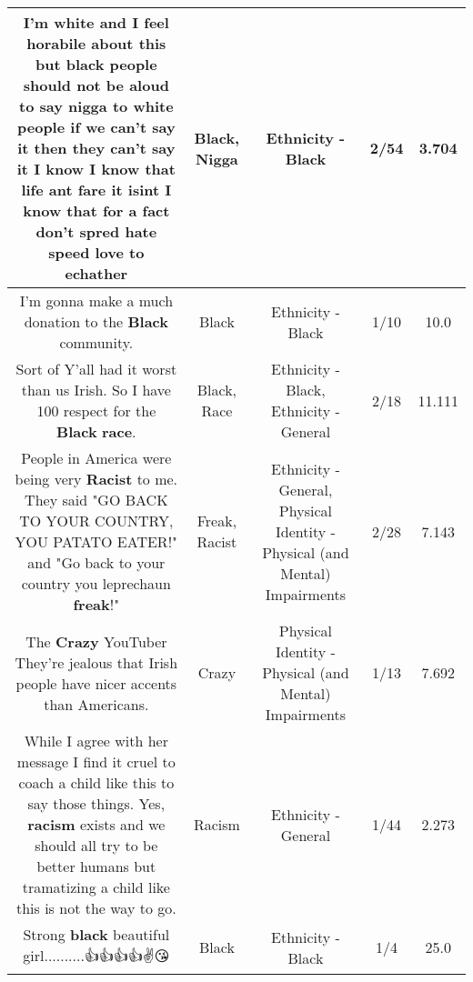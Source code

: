 \documentclass[11pt]{article}
\newlength\mylength
\begin{document}
\begin{center}
\begin{longtable}{|C{.65\mylength}|C{.30\mylength}|C{.12\mylength}|C{.12\mylength}|C{.12\mylength}|}
  \small I'm white and I feel horabile about this but \textbf{black} people should not be aloud to say \textbf{nigga} to white people if we can't say it then they can't say it I know I know  that life ant fare it isint I know that for a fact don't spred hate speed love to echather\normalsize   & Black, Nigga & Ethnicity - Black & 2/54 & 3.704 \\  \hline
  \small I'm gonna make a much donation to the \textbf{Black} community.\normalsize   & Black & Ethnicity - Black & 1/10 & 10.0 \\  \hline
  \small Sort of Y'all had it worst than us Irish. So I have 100 respect for the \textbf{Black} \textbf{race}.\normalsize   & Black, Race & Ethnicity - Black, Ethnicity - General & 2/18 & 11.111 \\  \hline
  \small People in America were being very \textbf{Racist} to me. They said "GO BACK TO YOUR COUNTRY, YOU PATATO EATER!" and "Go back to your country you leprechaun \textbf{freak}!"\normalsize   & Freak, Racist & Ethnicity - General, Physical Identity - Physical (and Mental) Impairments & 2/28 & 7.143 \\  \hline
  \small The \textbf{Crazy} YouTuber They're jealous that Irish people have nicer accents than Americans.\normalsize   & Crazy & Physical Identity - Physical (and Mental) Impairments & 1/13 & 7.692 \\  \hline
  \small While I agree with her message I find it cruel to coach a child like this to say those things. Yes, \textbf{racism} exists and we should all try to be better humans but tramatizing a child like this is not the way to go.\normalsize   & Racism & Ethnicity - General & 1/44 & 2.273 \\  \hline
  \small Strong \textbf{black} beautiful girl..........👍👍👍👍✌😘\normalsize   & Black & Ethnicity - Black & 1/4 & 25.0 \\  \hline

\end{longtable}
\end{center}
\end{document}
